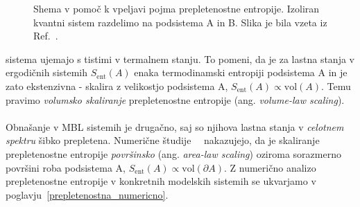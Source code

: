 \begin{minipage}[t]{0.32\textwidth}
\begin{figure}[H]
\caption{
Shema v pomoč k vpeljavi pojma prepletenostne entropije. Izoliran kvantni sistem razdelimo na podsistema A in B.
Slika je bila vzeta iz Ref.~\cite{nandkishore2015many}. 
}
\label{fig:nandkishore_huse_subsystems}
\end{figure}
\end{minipage}
  sistema 
ujemajo s tistimi v termalnem stanju.
To pomeni, da je za lastna stanja v ergodičnih sistemih $S_\mathrm{ent}(A)$ enaka termodinamski entropiji podsistema A in je zato ekstenzivna - skalira z velikostjo
podsistema A, $S_\mathrm{ent}(A)\propto \mathrm{vol}(A).$ Temu pravimo \emph{volumsko skaliranje} prepletenostne entropije (ang. \emph{volume-law scaling}). \\\\Obnašanje v 
MBL sistemih je drugačno, saj so njihova lastna stanja v \emph{celotnem spektru} šibko prepletena. Numerične študije~\cite{serbyn2013local}~\cite{bauer2013area} nakazujejo, da je skaliranje prepletenostne entropije \emph{površinsko} (ang. \emph{area-law scaling}) oziroma sorazmerno površini roba podsistema A, $S_\mathrm{ent}(A)\propto \mathrm{vol}(\partial A)$. Z numerično analizo prepletenostne entropije v konkretnih modelskih sistemih se ukvarjamo v poglavju~\ref{prepletenostna_numericno}.

